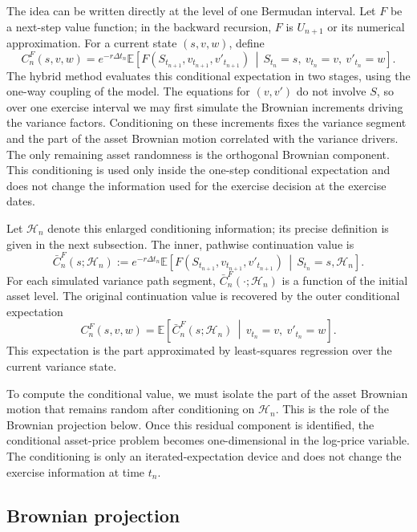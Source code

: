 \documentclass[pdflatex,sn-mathphys-num]{sn-jnl}
\theoremstyle{thmstyleone}%
\theoremstyle{thmstylethree}%
\theoremstyle{thmstyletwo}%
\newcommand{\E}{\mathbb E}
\begin{document}
The idea can be written directly at the level of one Bermudan interval. Let \(F\) be
a next-step value function; in the backward recursion, \(F\) is \(U_{n+1}\) or its
numerical approximation. For a current state \((s,v,w)\), define
\[
C_n^F(s,v,w)
=
e^{-r\Delta t_n}
\E\!\left[
F(S_{t_{n+1}},v_{t_{n+1}},v'_{t_{n+1}})
\,\middle|\,
S_{t_n}=s,\ v_{t_n}=v,\ v'_{t_n}=w
\right].
\]
The hybrid method evaluates this conditional expectation in two stages, using
the one-way coupling of the model. The equations for $(v,v')$ do not involve
$S$, so over one exercise interval we may first simulate the Brownian increments
driving the variance factors. Conditioning on these increments fixes the
variance segment and the part of the asset Brownian motion correlated with the
variance drivers. The only remaining asset randomness is the orthogonal
Brownian component. This conditioning is used only inside the one-step
conditional expectation and does not change the information used for the
exercise decision at the exercise dates.

Let \(\mathcal H_n\) denote this enlarged conditioning information; its precise
definition is given in the next subsection. The inner, pathwise continuation value is
\[
\bar C_n^F(s;\mathcal H_n):=
e^{-r\Delta t_n}
\E\!\left[
F(S_{t_{n+1}},v_{t_{n+1}},v'_{t_{n+1}})
\,\middle|\,
S_{t_n}=s,\mathcal H_n
\right].
\]
For each simulated variance path segment, \(\bar C_n^F(\cdot;\mathcal H_n)\) is a
function of the initial asset level. The original continuation value is recovered by the outer conditional expectation
\[
C_n^F(s,v,w)
=
\E\!\left[
\bar C_n^F(s;\mathcal H_n)
\,\middle|\,
v_{t_n}=v,\ v'_{t_n}=w
\right].
\]
This expectation is the part approximated by least-squares regression over the current variance state.

To compute the conditional value, we must isolate the part of the asset Brownian motion that remains random after conditioning on \(\mathcal H_n\). This is the role of the Brownian projection below. Once this residual component is identified, the conditional asset-price problem becomes one-dimensional in the log-price variable. The conditioning is only an iterated-expectation device and does not change the exercise information at time \(t_n\).

\subsection{Brownian projection}
\end{document}
